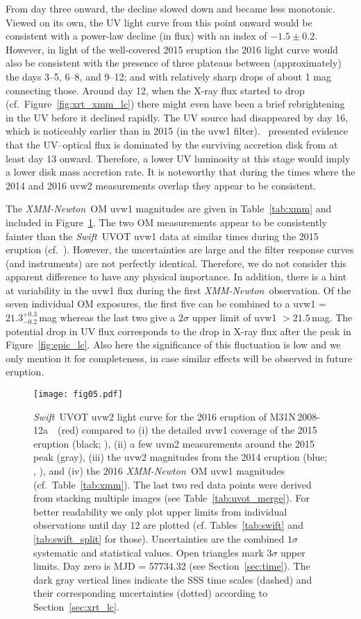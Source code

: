 \documentclass[twocolumn,tighten]{aastex6}
\def\swift{{\it Swift~}}
\def\xmm{{\it XMM-Newton~}}
\def\nova{{M31N\,2008-12a~}}
\newcommand{\otwok}{\citetalias{2015A&A...580A..45D}}
\newcommand{\xtwok}{\citetalias{2015A&A...580A..46H}}
\newcommand{\othreek}{\citetalias{2016ApJ...833..149D}}
\newcommand{\hstphot}{\citetalias{2017ApJ...849...96D}}
\begin{document}
From day three onward, the decline slowed down and became less monotonic. Viewed on its own, the UV light curve from this point onward would be consistent with a power-law decline (in flux) with an index of $-1.5\pm0.2$. However, in light of the well-covered 2015 eruption the 2016 light curve would also be consistent with the presence of three plateaus between (approximately) the days 3--5, 6--8, and 9--12; and with relatively sharp drops of about 1 mag connecting those. Around day 12, when the X-ray flux started to drop (cf.\ Figure~\ref{fig:xrt_xmm_lc}) there might even have been a brief rebrightening in the UV before it declined rapidly. The UV source had disappeared by day 16, which is noticeably earlier than in 2015 (in the uvw1 filter).  \hstphot\ presented evidence that the UV--optical flux is dominated by the surviving accretion disk from at least day 13 onward.  Therefore, a lower UV luminosity at this stage would imply a lower disk mass accretion rate. It is noteworthy that during the times where the 2014 and 2016 uvw2 measurements overlap they appear to be consistent.

The \xmm OM uvw1 magnitudes are given in Table~\ref{tab:xmm} and included in Figure~\ref{fig:uvot_lc}. The two OM measurements appear to be consistently fainter than the \swift UVOT uvw1 data at similar times during the 2015 eruption (cf.\ \othreek). However, the uncertainties are large and the filter response curves (and instruments) are not perfectly identical. Therefore, we do not consider this apparent difference to have any physical importance. In addition, there is a hint at variability in the uvw1 flux during the first \xmm observation. Of the seven individual OM exposures, the first five can be combined to a uvw1 = $21.3^{+0.3}_{-0.2}$\,mag whereas the last two give a $2\sigma$ upper limit of uvw1 $> 21.5$\,mag. The potential drop in UV flux corresponds to the drop in X-ray flux after the peak in Figure~\ref{fig:epic_lc}. Also here the significance of this fluctuation is low and we only mention it for completeness, in case similar effects will be observed in future eruption.

\begin{figure}
\texttt{[image: fig05.pdf]}
\caption{\swift UVOT uvw2 light curve for the 2016 eruption of \nova\ (red) compared to (i) the detailed uvw1 coverage of the 2015 eruption (black; \othreek), (ii) a few uvm2 measurements around the 2015 peak (gray), (iii) the uvw2 magnitudes from the 2014 eruption (blue; \otwok, \xtwok), and (iv) the 2016 \xmm OM uvw1 magnitudes (cf.\ Table~\ref{tab:xmm}). The last two red data points were derived from stacking multiple images (see Table~\ref{tab:uvot_merge}). For better readability we only plot upper limits from individual observations until day 12 are plotted (cf. Tables~\ref{tab:swift} and \ref{tab:swift_split} for those). Uncertainties are the combined $1\sigma$ systematic and statistical values. Open triangles mark $3\sigma$ upper limits. Day zero is MJD = 57734.32 (see Section~\ref{sec:time}). The dark gray vertical lines indicate the SSS time scales (dashed) and their corresponding uncertainties (dotted) according to Section~\ref{sec:xrt_lc}.}
\label{fig:uvot_lc}
\end{figure}
\end{document}
